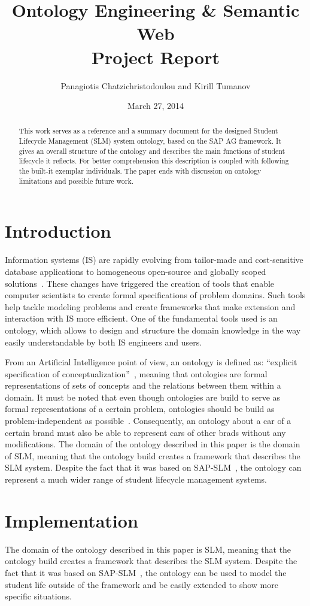 \documentclass{article}    %
\title{Ontology Engineering \& Semantic Web \\ Project Report}  %
\author{Panagiotis Chatzichristodoulou and Kirill Tumanov}    %
\date{March 27, 2014}   %
\begin{document}
%
\maketitle                 %
%
\begin{abstract}
%
This work serves as a reference and a summary document for the designed Student Lifecycle Management (SLM) system ontology, based on the SAP AG framework. It gives an overall structure of the ontology and describes the main functions of student lifecycle it reflects. For better comprehension this description is coupled with following the built-it exemplar individuals. The paper ends with discussion on ontology limitations and possible future work.
%
\end{abstract}
%
% 
\section{Introduction}
%
Information systems (IS) are rapidly evolving from tailor-made and cost-sensitive database applications to homogeneous open-source and globally scoped solutions~\cite{ant:vha}. These changes have triggered the creation of tools that enable computer scientists to create formal specifications of problem domains. Such tools help tackle modeling problems and create frameworks that make extension and interaction with IS more efficient. One of the fundamental tools used is an ontology, which allows to design and structure the domain knowledge in the way easily understandable by both IS engineers and users.

From an Artificial Intelligence point of view, an ontology is defined as: ``explicit specification of conceptualization''~\cite{gru}, meaning that ontologies are formal representations of sets of concepts and the relations between them within a domain. It must be noted that even though ontologies are build to serve as formal representations of a certain problem, ontologies should be build as problem-independent as possible~\cite{gua:wel}. Consequently, an ontology about a car of a certain brand must also be able to represent cars of other brads without any modifications. The domain of the ontology described in this paper is the domain of SLM, meaning that the ontology build creates a framework that describes the SLM system. Despite the fact that it was based on SAP-SLM~\cite{sap}, the ontology can represent a much wider range of student lifecycle management systems.
% 
\section{Implementation}
%
The domain of the ontology described in this paper is SLM, meaning that the ontology build creates a framework that describes the SLM system. Despite the fact that it was based on SAP-SLM~\cite{sap}, the ontology can be used to model the student life outside of the framework and be easily extended to show more specific situations.
\end{document}
